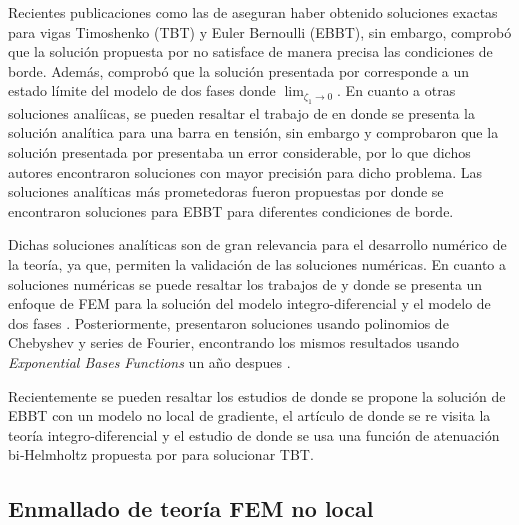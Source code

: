 \documentclass{article}
\begin{document}
Recientes publicaciones como las de \textcite{Tuna2016} aseguran haber obtenido soluciones exactas para vigas Timoshenko (TBT) y Euler Bernoulli (EBBT), sin embargo, \textcite{Romano2016} comprobó que la solución propuesta por \textcite{Tuna2016} no satisface de manera precisa las condiciones de borde. Además, \textcite{Wang2016} comprobó que la solución presentada por \textcite{Tuna2016} corresponde a un estado límite del modelo de dos fases donde $\lim_{\zeta_{1} \to 0}$. En cuanto a otras soluciones analíicas, se pueden resaltar el trabajo de \textcite{ANGELAPISANO200313} en donde se presenta la solución analítica para una barra en tensión, sin embargo \textcite{Benvenuti2013} y \textcite{Zhu2012} comprobaron que la solución presentada por \textcite{ANGELAPISANO200313} presentaba un error considerable, por lo que dichos autores encontraron soluciones con mayor precisión para dicho problema. Las soluciones analíticas más prometedoras fueron propuestas por \textcite{Wang2016} donde se encontraron soluciones para EBBT para diferentes condiciones de borde.

Dichas soluciones analíticas son de gran relevancia para el desarrollo numérico de la teoría, ya que, permiten la validación de las soluciones numéricas. En cuanto a soluciones numéricas se puede resaltar los trabajos de \textcite{Khodabakhshi2015} y \textcite{Pisano2009} donde se presenta un enfoque de FEM para la solución del modelo integro-diferencial \parencite{Khodabakhshi2015} y el modelo de dos fases \parencite{Pisano2009}. Posteriormente, \textcite{Abdollahi2013} presentaron soluciones usando polinomios de Chebyshev y series de Fourier, encontrando los mismos resultados usando \textit{Exponential Bases Functions} un año despues \parencite{Abdollahi2014}.


Recientemente se pueden resaltar los estudios de \textcite{Romano2021} donde se propone la solución de EBBT con un modelo no local de gradiente, el artículo de \textcite{Pisano2021a} donde se re visita la teoría integro-diferencial y el estudio de \textcite{Zhang2021} donde se usa una función de atenuación bi‐Helmholtz propuesta por \textcite{Lazar2006} para solucionar TBT.

\subsection*{Enmallado de teoría FEM no local}

\printbibliography[heading=bibintoc]
\end{document}
